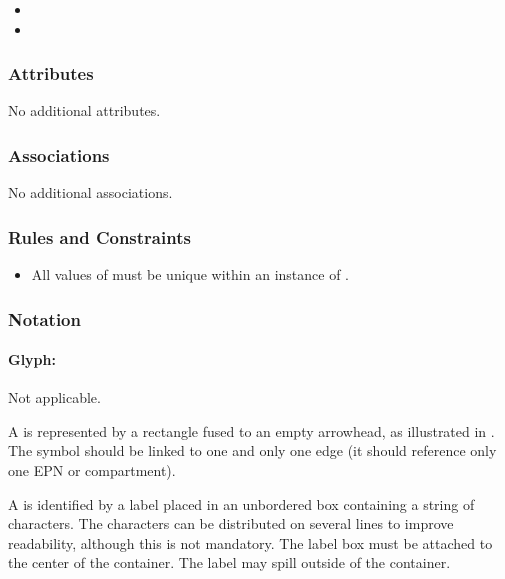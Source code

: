 \begin{itemize}
\item {}
\item {}
\end{itemize}

\subsubsection{Attributes}

No additional attributes.

\subsubsection{Associations}

No additional associations.

\subsubsection{Rules and Constraints}

\begin{itemize}
\item All values of  must be unique within an
  instance of .
\end{itemize}

\subsubsection{Notation}

\paragraph{Glyph: }
\label{sec:techref:tag}

\begin{glyphDescription}

\glyphSboTerm Not applicable.

\glyphContainer A  is represented by a rectangle fused to an empty arrowhead, as illustrated in .  The symbol should be linked to one and only one edge (\ie it should reference only one EPN or compartment).

\glyphLabel A  is identified by a label placed in an unbordered box containing a string of characters.  The characters can be distributed on several lines to improve readability, although this is not mandatory.  The label box must be attached to the center of the container. The label may spill outside of the container.

\end{glyphDescription}

